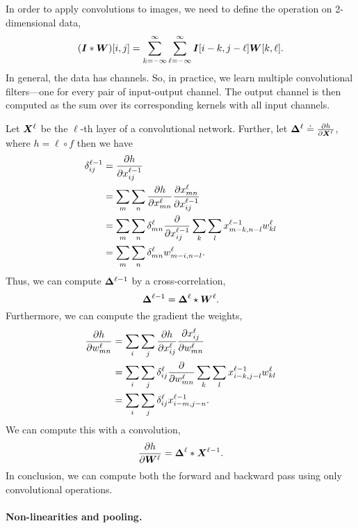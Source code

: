 In order to apply convolutions to images, we need to define the operation on 2-dimensional data, \[
    (\bm{I} * \bm{W})[i,j] = \sum_{k=-\infty}^{\infty} \sum_{\ell=-\infty}^{\infty} \bm{I}[i-k,j-\ell] \bm{W}[k,\ell].
\]
In general, the data has channels. So, in practice, we learn multiple convolutional filters---one
for every pair of input-output channel. The output channel is then computed as the sum over its
corresponding kernels with all input channels.

Let $\bm{X}^{\ell}$ be the $\ell$-th layer of a convolutional network. Further, let
$\bm{\Delta}^{\ell} \doteq \pdv{h}{\bm{X}^{\ell}}$, where $h = \ell \circ f$ then we have
\begin{align*}
    \delta^{\ell-1}_{ij} & = \pdv{h}{x^{\ell-1}_{ij}}                                                                                          \\
                         & = \sum_{m} \sum_{n} \pdv{h}{x^{\ell}_{mn}} \pdv{x^{\ell}_{mn}}{x^{\ell-1}_{ij}}                                     \\
                         & = \sum_{m} \sum_{n} \delta^{\ell}_{mn} \pdv*{\sum_{k} \sum_{l} x^{\ell-1}_{m-k,n-l} w^{\ell}_{kl}}{x^{\ell-1}_{ij}} \\
                         & = \sum_{m} \sum_{n} \delta^{\ell}_{mn} w^{\ell}_{m-i,n-l}.
\end{align*}
Thus, we can compute $\bm{\Delta}^{\ell-1}$ by a cross-correlation, \[
    \bm{\Delta}^{\ell-1} = \bm{\Delta}^{\ell} \star \bm{W}^{\ell}.
\]
Furthermore, we can compute the gradient \wrt the weights,
\begin{align*}
    \pdv{h}{w^\ell_{mn}} & = \sum_i \sum_j \pdv{h}{x^{\ell}_{ij}} \pdv{x^\ell_{ij}}{w^\ell_{mn}}                                       \\
                         & = \sum_i \sum_j \delta^{\ell}_{ij} \pdv*{\sum_{k} \sum_{l} x^{\ell-1}_{i-k,j-l} w^{\ell}_{kl}}{w^\ell_{mn}} \\
                         & = \sum_i \sum_j \delta^{\ell}_{ij} x^{\ell-1}_{i-m,j-n}.
\end{align*}
We can compute this with a convolution, \[
    \pdv{h}{\bm{W}^{\ell}} = \bm{\Delta}^{\ell} * \bm{X}^{\ell-1}.
\]
In conclusion, we can compute both the forward and backward pass using only convolutional
operations.

\paragraph{Non-linearities and pooling.}

